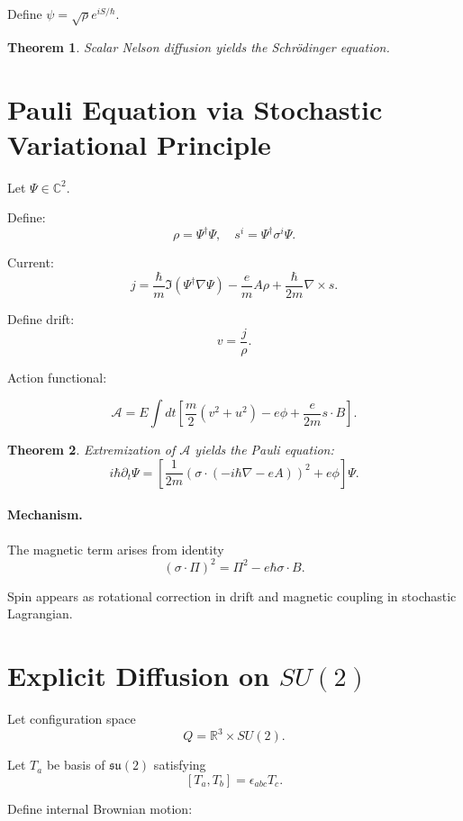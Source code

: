\documentclass[12pt]{article}
\newtheorem{theorem}{Theorem}
\begin{document}
Define $\psi=\sqrt{\rho}e^{iS/\hbar}$.

\begin{theorem}
Scalar Nelson diffusion yields the Schr\"odinger equation.
\end{theorem}

\section{Pauli Equation via Stochastic Variational Principle}

Let $\Psi \in \mathbb{C}^2$.

Define:
\[
\rho = \Psi^\dagger\Psi,
\quad
s^i = \Psi^\dagger\sigma^i\Psi.
\]

Current:
\[
j =
\frac{\hbar}{m}\Im(\Psi^\dagger\nabla\Psi)
- \frac{e}{m}A\rho
+ \frac{\hbar}{2m}\nabla\times s.
\]

Define drift:
\[
v=\frac{j}{\rho}.
\]

Action functional:

\[
\mathcal{A}
=
E\int dt
\left[
\frac{m}{2}(v^2+u^2)
- e\phi
+ \frac{e}{2m}s\cdot B
\right].
\]

\begin{theorem}
Extremization of $\mathcal{A}$ yields the Pauli equation:
\[
i\hbar\partial_t\Psi
=
\left[
\frac{1}{2m}(\sigma\cdot(-i\hbar\nabla-eA))^2
+ e\phi
\right]\Psi.
\]
\end{theorem}

\paragraph{Mechanism.}
The magnetic term arises from identity
\[
(\sigma\cdot\Pi)^2 = \Pi^2 - e\hbar\sigma\cdot B.
\]

Spin appears as rotational correction in drift and magnetic coupling
in stochastic Lagrangian.

\section{Explicit Diffusion on $SU(2)$}

Let configuration space
\[
Q=\mathbb{R}^3\times SU(2).
\]

Let $T_a$ be basis of $\mathfrak{su}(2)$ satisfying
\[
[T_a,T_b]=\epsilon_{abc}T_c.
\]

Define internal Brownian motion:
\end{document}
